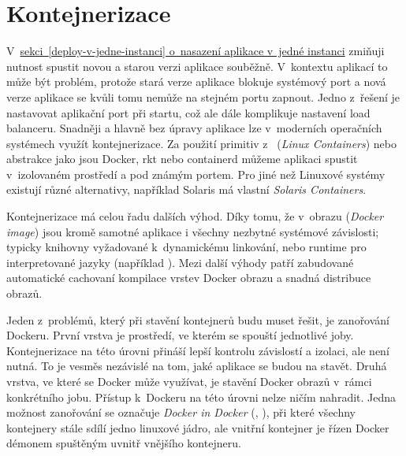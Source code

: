     \section*{Kontejnerizace}
        V~\hyperref[deploy-v-jedne-instanci]{sekci~\ref*{deploy-v-jedne-instanci} o~nasazení aplikace v~jedné instanci} zmiňuji nutnost spustit novou a starou verzi aplikace souběžně. V~kontextu \HTTP aplikací to může být problém, protože stará verze aplikace blokuje systémový port a nová verze aplikace se kvůli tomu nemůže na stejném portu zapnout. Jedno z~řešení je nastavovat aplikační port při startu, což ale dále komplikuje nastavení load balanceru. Snadněji a hlavně bez úpravy aplikace lze v~moderních operačních systémech využít kontejnerizace. Za použití primitiv z~ (\textit{Linux Containers}) nebo abstrakce jako jsou Docker, rkt nebo containerd můžeme aplikaci spustit v~izolovaném prostředí a pod známým portem. Pro jiné než Linuxové systémy existují různé alternativy, například Solaris má vlastní \textit{Solaris Containers}.

        Kontejnerizace má celou řadu dalších výhod. Díky tomu, že v~obrazu (\textit{Docker image}) jsou kromě samotné aplikace i všechny nezbytné systémové závislosti; typicky knihovny vyžadované k~dynamickému linkování, nebo runtime pro interpretované jazyky (například ). Mezi další výhody patří zabudované automatické cachovaní kompilace vrstev Docker obrazu a snadná distribuce obrazů.

        \label{sec:dind}
        Jeden z~problémů, který při stavění kontejnerů budu muset řešit, je zanořování Dockeru. První vrstva je prostředí, ve kterém se spouští jednotlivé \CI joby. Kontejnerizace na této úrovni přináší lepší kontrolu závislostí a izolaci, ale není nutná. To je vesměs nezávislé na tom, jaké aplikace se budou na \CI stavět. Druhá vrstva, ve které se Docker může využívat, je stavění Docker obrazů v~rámci konkrétního \CI jobu. Přístup k~Dockeru na této úrovni nelze ničím nahradit. Jedna možnost zanořování se označuje \textit{Docker in Docker} (, ), při které všechny kontejnery stále sdílí jedno linuxové jádro, ale vnitřní kontejner je řízen Docker démonem spuštěným uvnitř vnějšího kontejneru.

